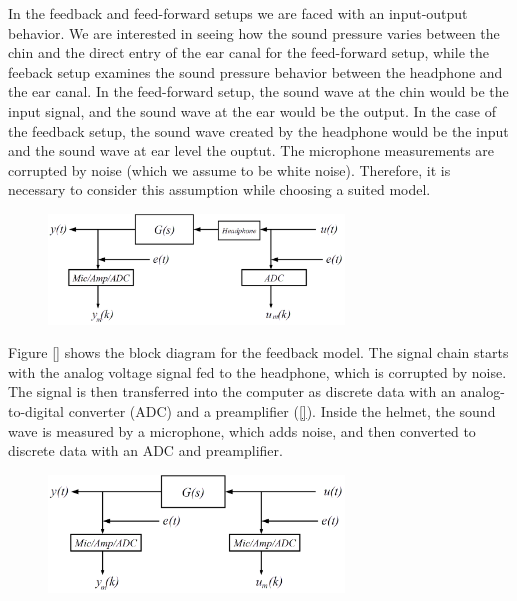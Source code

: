 In the feedback and feed-forward setups we are faced with an input-output behavior. We are interested in seeing how the sound pressure varies between the chin and the direct entry of the ear canal for the feed-forward setup, while the feeback setup examines the sound pressure behavior between the headphone and the ear canal. In the feed-forward setup, the sound wave at the chin would be the input signal, and the sound wave at the ear would be the output. In the case of the feedback setup, the sound wave created by the headphone would be the input and the sound wave at ear level the ouptut. The microphone measurements are corrupted by noise (which we assume to be white noise). Therefore, it is necessary to consider this assumption while choosing a suited model.\\

\begin{figure}[h]
\centering
\includegraphics[width=0.7\textwidth]{pics/modelfb}
\caption{}
\label{pic:}
\end{figure}

Figure \ref{} shows the block diagram for the feedback model. The signal chain starts with the analog voltage signal fed to the headphone, which is corrupted by noise. The signal is then transferred into the computer as discrete data with an analog-to-digital converter (ADC) and a preamplifier (\ref{}). Inside the helmet, the sound wave is measured by a microphone, which adds noise, and then converted to discrete data with an ADC and preamplifier. \\

\begin{figure}[h]
\centering
\includegraphics[width=0.7\textwidth]{pics/modelff}
\caption{}
\label{pic:}
\end{figure}

